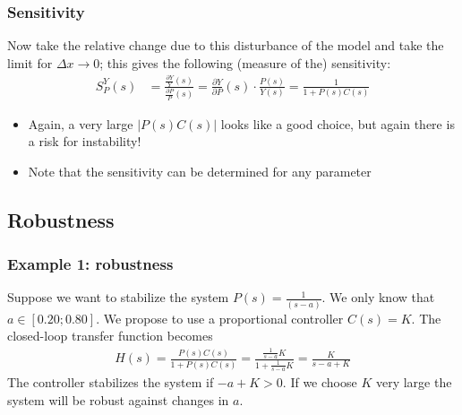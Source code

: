 \begin{frame}
	\frametitle{Sensitivity}
	\begin{alertblock}{}
		Now take the relative change due to this disturbance of the model and take the limit for $\Delta x \rightarrow 0$; this gives the following (measure of the) sensitivity:
		\begin{align*}
			S_P^Y(s) &= \frac{\frac{\partial Y}{Y}(s)}{\frac{\partial P}{P}(s)} = \frac{\partial Y}{\partial P}\left(s\right) \cdot \frac{P(s)}{Y(s)} = \frac{1}{1 + P(s)C(s)}
		\end{align*}
	\end{alertblock}
	\begin{block}{}
		\begin{itemize}
			\item Again, a very large $\left|P(s)C(s)\right|$ looks like a good choice, but again there is a risk for instability!
			\item Note that the sensitivity can be determined for any parameter	
		\end{itemize}
	\end{block}
\end{frame}


\subsection[Robustness]{Robustness}
\begin{frame}
	\frametitle{Example 1: robustness}
	\begin{example}{}
		Suppose we want to stabilize the system $P(s)=\frac{1}{(s - a)}$.  We only know that $a \in [0.20;0.80]$. We propose to use a proportional controller $C(s)=K$.
		The closed-loop transfer function becomes
		\begin{align*}
			H(s) = \frac{P(s)C(s)}{1+P(s)C(s)} = \frac{\frac{1}{s-a}K}{1+\frac{1}{s-a}K} = \frac{K}{s-a+K}
		\end{align*}
		The controller stabilizes the system if $ - a+K>0$. If we choose $K$ very large the system will be robust against changes in $a$.
		
	\end{example}
\end{frame}


